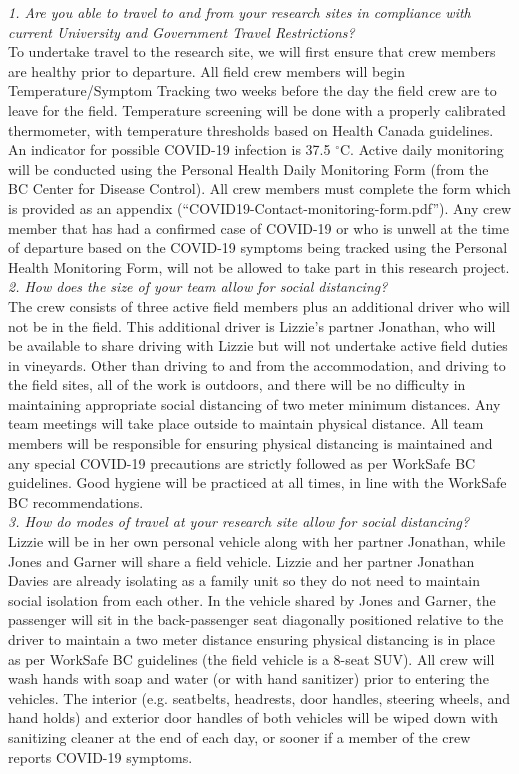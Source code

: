\documentclass[11pt,letter]{article}
\begin{document}
\emph{1. Are you able to travel to and from your research sites in compliance with current University and Government Travel Restrictions?}\\
To undertake travel to the research site, we will first ensure that crew members are healthy prior to departure. All field crew members will begin Temperature/Symptom Tracking two weeks before the day the field crew are to leave for the field. Temperature screening will be done with a properly calibrated thermometer, with temperature thresholds based on Health Canada guidelines. An indicator for possible COVID-19 infection is 37.5 $^{\circ}$C. Active daily monitoring will be conducted using the Personal Health Daily Monitoring Form (from the BC Center for Disease Control). All crew members must complete the form which is provided as an appendix (``COVID19-Contact-monitoring-form.pdf''). Any crew member that has had a confirmed case of COVID-19 or who is unwell at the time of departure based on the COVID-19 symptoms being tracked using the Personal Health Monitoring Form, will not be allowed to take part in this research project.\\
   
\emph{2. How does the size of your team allow for social distancing?}\\
The crew consists of three active field members plus an additional driver who will not be in the field. This additional driver is Lizzie's partner Jonathan, who will be available to share driving with Lizzie but will not undertake active field duties in vineyards. Other than driving to and from the accommodation, and driving to the field sites, all of the work is outdoors, and there will be no difficulty in maintaining appropriate social distancing of two meter minimum distances. Any team meetings will take place outside to maintain physical distance. All team members will be responsible for ensuring physical distancing is maintained and any special COVID-19 precautions are strictly followed as per WorkSafe BC guidelines. Good hygiene will be practiced at all times, in line with the WorkSafe BC recommendations. \\

\emph{3. How do modes of travel at your research site allow for social distancing?}\\
Lizzie will be in her own personal vehicle along with her partner Jonathan, while Jones and Garner will share a field vehicle. Lizzie and her partner Jonathan Davies are already isolating as a family unit so they do not need to maintain social isolation from each other. In the vehicle shared by Jones and Garner, the passenger will sit in the back-passenger seat diagonally positioned relative to the driver to maintain a two meter distance ensuring physical distancing is in place as per WorkSafe BC guidelines (the field vehicle is a 8-seat SUV). All crew will wash hands with soap and water (or with hand sanitizer) prior to entering the vehicles. The interior (e.g. seatbelts, headrests, door handles, steering wheels, and hand holds) and exterior door handles of both vehicles will be wiped down with sanitizing cleaner at the end of each day, or sooner if a member of the crew reports COVID-19 symptoms.\\  
\end{document}
